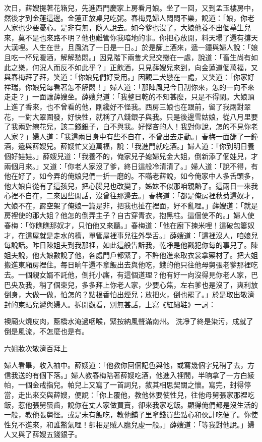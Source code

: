 次日，薛嫂提著花箱兒，先進西門慶家上房看月娘。坐了一回，又到孟玉樓房中，然後才到金蓮這邊。金蓮正放桌兒吃粥。春梅見婦人悶悶不樂，說道：「娘，你老人家也少要憂心。是非有無，隨人說去。如今爹也沒了，大娘他養不出個墓生兒來，莫不是也來路不明？他也難管你我暗地的事。你把心放開，料天塌了還有撐天大漢哩。人生在世，且風流了一日是一日。」於是篩上酒來，遞一鐘與婦人說：「娘且吃一杯兒暖酒，解解愁悶。」因見階下兩隻犬兒交戀在一處，說道：「畜生尚有如此之樂，何況人而反不如此乎？」正飲酒，只見薛嫂兒來到，向金蓮道個萬福，又與春梅拜了拜，笑道：「你娘兒們好受用。」因觀二犬戀在一處，又笑道：「你家好祥瑞，你娘兒每看著怎不解悶！」婦人道：「那陣風兒今日刮你來，怎的一向不來走走？」一面讓薛嫂坐。薛嫂兒道：「我整日乾的不知甚麼，只是不得閑。大娘頂上進了香來，也不曾看的他，剛纔好不怪我。西房三娘也在跟前，留了我兩對翠花，一對大翠圍發，好快性，就稱了八錢銀子與我。只是後邊雪姑娘，從八月里要了我兩對線花兒，該二錢銀子，白不與我。好慳吝的人！我對你說，怎的不見你老人家？」婦人道：「我這兩日身中有些不自在，不曾出去走動。」春梅一面篩了一鐘酒，遞與薛嫂兒。薛嫂忙又道萬福，說：「我進門就吃酒。」婦人道：「你到明日養個好娃娃。」薛嫂兒道：「我養不的，俺家兒子媳婦兒金大姐，倒新添了個娃兒，才兩個月來。」又道：「你老人家沒了爹，終日這般冷清清了。」婦人道：「說不得，有他在好了，如今弄的俺娘兒們一折一磨的。不瞞老薛說，如今俺家中人多舌頭多，他大娘自從有了這孩兒，把心腸兒也改變了，姊妹不似那咱親熱了。這兩日一來我心裡不自在，二來因些閑話，沒曾往那邊去。」春梅道：「都是俺房裡秋菊這奴才，大娘不在，霹空架了俺娘一篇是非，把我也扯在裡面，好不亂哩。」薛嫂道：「就是房裡使的那大姐？他怎的倒弄主子？自古穿青衣，抱黑柱。這個使不的。」婦人使春梅：「你瞧瞧那奴才，只怕他又來聽。」春梅道：「他在廚下揀米哩！這破包簍奴才，在這屋就是走水的槽，單管屋裡事兒往外學舌。」薛嫂道：「這裡沒人，咱娘兒每說話。昨日陳姐夫到我那裡，如此這般告訴我，乾凈是他戳犯你每的事兒了。陳姐夫說，他大娘數說了他，各處門戶都緊了，不許他進來取衣裳拿藥材了。把大姐搬進東廂房裡住。每日晌午還不拿飯出去與他吃，餓的他只往他母舅張老爹那裡吃去。一個親女婿不託他，倒托小廝，有這個道理？他有好一向沒得見你老人家，巴巴央及我，稍了個柬兒，多多拜上你老人家，少要心焦，左右爹也是沒了，爽利放倒身，大做一做，怕怎的？點根香怕出煙兒；放把火，倒也罷了。」於是取出敬濟封的柬貼兒遞與婦人。拆開觀看，別無甚話，上寫《紅繡鞋》一詞：

襖廟火燒皮肉，藍橋水淹過咽喉，緊按納風聲滿南州。 洗凈了終是染污，成就了倒是風流，不怎麼也是有。

六姐妝次敬濟百拜上

婦人看畢，收入袖中。薛嫂道：「他教你回個記色與他，或寫幾個字兒稍了去，方信我送的有個下落。」婦人教春梅陪著薛嫂吃酒，他進入裡間，半晌拿了一方白綾帕，一個金戒指兒。帕兒上又寫了一首詞兒，敘其相思契闊之懷。寫完，封得停當，走出來交與薛嫂，便說：「你上覆他，教他休要使性兒，往他母舅張家那裡吃飯，惹他張舅蜃齒，說你在丈人家做買賣，卻來我家吃飯。顯得俺們都是沒生活的一般，教他張舅怪。或是未有飯吃，教他鋪子里拿錢買些點心和伙計吃便了。你使性兒不進來，和誰鱉氣哩！卻相是賊人膽兒虛一般。」薛嫂道：「等我對他說。」婦人又與了薛嫂五錢銀子。

